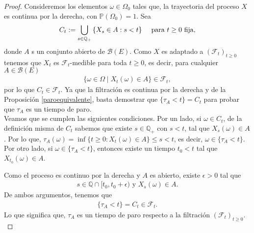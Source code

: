 \begin{proof}
	Consideremos los elementos $\omega \in \Omega_0$ tales que, la trayectoria del proceso $X$ es continua por la derecha, con $\mathbb{P}(\Omega_0) = 1$. Sea
	\begin{align*}
	C_t : = \bigcup_{s \in \mathbb{Q}_{+}} \left\lbrace X_s \in A : s < t \right\rbrace \hspace{0.3cm} \text{ para } t \geq 0 \text{ fija}, 
	\end{align*}
	donde $A$ s un conjunto abierto de $\mathcal{B}(E)$. Como $X$ es adaptado a $(\mathcal{F}_t)_{t \geq 0}$ tenemos que $X_t$ es $\mathcal{F}_t$-medible para toda $t \geq 0$, es decir, para cualquier $A \in \mathcal{B}(E)$
	\begin{align*}
	\{ \omega \in \Omega \mid X_t (\omega) \in A \} \in \mathcal{F}_t,
	\end{align*}
	por lo que $C_t \in \mathcal{F}_t$. Ya que la filtración es continua por la derecha y de la Proposición \ref{paroequivalente}, basta demostrar que $\{\tau_A < t\} = C_t$ para probar que $\tau_A$ es un tiempo de paro. \\
	
	Veamos que se cumplen las siguientes condiciones. Por un lado, si $\omega \in C_t$, de la definición misma de $C_t$ sabemos que existe $s \in \mathbb{Q}_{+}$ con $s < t$, tal que $X_s(\omega) \in A$. Por lo que, $\tau_A(\omega) = \inf \{ t \geq 0 : X_t (\omega) \in A \} \leq s < t$, es decir, $\omega \in \{\tau_A < t\}$. Por otro lado, si $\omega \in \{\tau_A < t\}$, entonces existe un tiempo $t_0 < t$ tal que $X_{t_0} (\omega) \in A$. 
	
	Como el proceso es continuo por la derecha y $A$ es abierto, existe $\epsilon > 0$ tal que
	\begin{align*}
	s \in \mathbb{Q}\cap [t_0, t_0 + \epsilon) \text{ y } X_s(\omega) \in A.
	\end{align*}
	De ambos argumentos, tenemos que 
	\begin{align*}
	\{ \tau_A < t \} = C_t \in \mathcal{F}_t.
	\end{align*}
	Lo que significa que, $\tau_A$ es un tiempo de paro respecto a la filtración $(\mathcal{F}_t)_{t \geq 0}$. \\
    

\end{proof}
